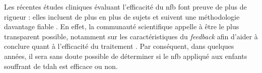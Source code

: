 Les récentes études cliniques évaluant l'efficacité du \gls{nfb} 
font preuve de plus de rigueur : elles incluent de plus en plus de sujets et suivent une méthodologie davantage fiable \citep{Bioulac2019}. 
En effet, la communauté scientifique appelle à être le plus transparent possible, notamment sur les caractéristiques du \textit{feedback} afin d'aider à 
conclure quant à l'efficacité du traitement \citep{Ros2019}. Par conséquent, dans quelques années, il sera sans doute possible de déterminer si le \gls{nfb} 
appliqué aux enfants souffrant de \gls{tdah} est efficace ou non.



